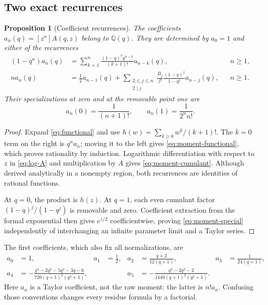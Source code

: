 \documentclass[11pt,a4paper]{article}
\numberwithin{equation}{section}
\newtheorem{proposition}[theorem]{Proposition}
\theoremstyle{definition}
\theoremstyle{remark}
\newcommand{\Q}{\mathbb Q}
\begin{document}
\subsection{Two exact recurrences}
\begin{proposition}[Coefficient recurrences]\label{prop:recurrences}
The coefficients \(a_n(q)=[z^n]A(q,z)\) belong to \(\Q(q)\). They are determined by \(a_0=1\) and either of the recurrences
\begin{align}
 (1-q^n)a_n(q)
 &=\sum_{k=1}^n\frac{(1-q)^kq^{n-k}}{(k+1)!}a_{n-k}(q),
 &&n\ge1,\label{eq:moment-functional}\\
 n a_n(q)
 &=\frac12a_{n-1}(q)+
 \sum_{\substack{2\le j\le n\\2\mid j}}
 \frac{B_j}{j!}\frac{(1-q)^j}{1-q^j}a_{n-j}(q),
 &&n\ge1.\label{eq:moment-cumulant}
\end{align}
Their specializations at zero and at the removable point one are
\begin{equation}\label{eq:moment-special}
 a_n(0)=\frac1{(n+1)!},\qquad
 a_n(1)=\frac1{2^n n!}.
\end{equation}
\end{proposition}
\begin{proof}
Expand \eqref{eq:functional} and use \(h(w)=\sum_{k\ge0}w^k/(k+1)!\). The \(k=0\) term on the right is \(q^na_n\); moving it to the left gives \eqref{eq:moment-functional}, which proves rationality by induction. Logarithmic differentiation with respect to \(z\) in \eqref{eq:log-A} and multiplication by \(A\) gives \eqref{eq:moment-cumulant}. Although derived analytically in a nonempty region, both recurrences are identities of rational functions.

At \(q=0\), the product is \(h(z)\). At \(q=1\), each even cumulant factor \((1-q)^j/(1-q^j)\) is removable and zero. Coefficient extraction from the formal exponential then gives \(e^{z/2}\) coefficientwise, proving \eqref{eq:moment-special} independently of interchanging an infinite parameter limit and a Taylor series.
\end{proof}

The first coefficients, which also fix all normalizations, are
\begin{align*}
 a_0&=1,& a_1&=\frac12,&
 a_2&=\frac{q+2}{12(q+1)},&a_3&=\frac1{24(q+1)},\\
 a_4&=-\frac{q^4-2q^3-5q^2-3q-6}{720(q+1)^2(q^2+1)},&&&
 a_5&=-\frac{q^3-2q^2-2}{1440(q+1)^2(q^2+1)}.
\end{align*}
Here \(a_n\) is a Taylor coefficient, not the raw moment: the latter is \(n!a_n\). Confusing those conventions changes every residue formula by a factorial.
\end{document}
